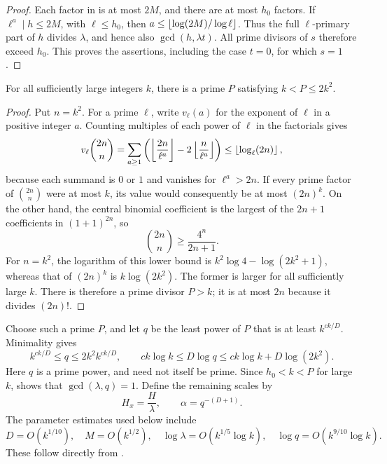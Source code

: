 \begin{proof}
Each factor in  is at most $2M$,
and there are at most $h_0$ factors. If $\ell^a\mid h\le2M$, with
$\ell\le h_0$, then $a\le\left\lfloor\log(2M)/\log\ell\right\rfloor$.
Thus the full $\ell$-primary part of $h$ divides $\lambda$, and hence
also $\gcd(h,\lambda t)$. All prime divisors of $s$ therefore exceed
$h_0$. This proves the assertions, including the case $t=0$, for which
$s=1$.
\end{proof}

\begin{lemma}\label{setup:prime}
For all sufficiently large integers $k$, there is a prime $P$ satisfying
$k<P\le2k^2$.
\end{lemma}

\begin{proof}
Put $n=k^2$. For a prime $\ell$, write $v_\ell(a)$ for the exponent
of $\ell$ in a positive integer $a$. Counting multiples of each power
of $\ell$ in the factorials gives
\[
 v_\ell\binom{2n}{n}
 =\sum_{a\ge1}\left(\left\lfloor\frac{2n}{\ell^a}\right\rfloor
              -2\left\lfloor\frac n{\ell^a}\right\rfloor\right)
 \le\left\lfloor\log_\ell(2n)\right\rfloor,
\]
because each summand is $0$ or $1$ and vanishes for $\ell^a>2n$.
If every prime factor of $\binom{2n}{n}$ were at most $k$, its value
would consequently be at most $(2n)^k$. On the other hand, the central
binomial coefficient is the largest of the $2n+1$ coefficients in
$(1+1)^{2n}$, so
\[
 \binom{2n}{n}\ge\frac{4^n}{2n+1}.
\]
For $n=k^2$, the logarithm of this lower bound is
$k^2\log4-\log(2k^2+1)$, whereas that of $(2n)^k$ is
$k\log(2k^2)$. The former is larger for all sufficiently large $k$.
There is therefore a prime divisor $P>k$; it is at most $2n$ because it
divides $(2n)!$.
\end{proof}

Choose such a prime $P$, and let $q$ be the least power of $P$ that is
at least $k^{ck/D}$. Minimality gives
\begin{equation}\label{setup:q-bounds}
 k^{ck/D}\le q\le2k^2 k^{ck/D},\qquad
 ck\log k\le D\log q\le ck\log k+D\log(2k^2).
\end{equation}
Here $q$ is a prime power, and need not itself be prime. Since
$h_0<k<P$ for large $k$,  shows that
$\gcd(\lambda,q)=1$. Define the remaining scales by
\begin{equation}\label{setup:mesh-parameters}
 H_x=\frac H\lambda,\qquad \alpha=q^{-(D+1)}.
\end{equation}
The parameter estimates used below include
\begin{equation}\label{setup:orders}
 D=O(k^{1/10}),\quad M=O(k^{1/2}),\quad
 \log\lambda=O(k^{1/5}\log k),\quad
 \log q=O(k^{9/10}\log k).
\end{equation}
These follow directly from .

